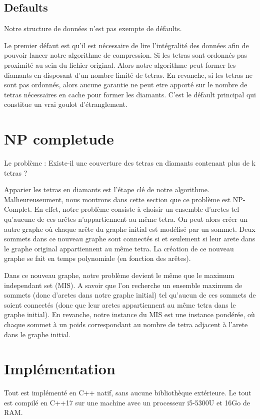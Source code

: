 \documentclass[a4paper,11pt,openany]{article}
\begin{document}
\subsection{Defaults}
Notre structure de données n'est pas exempte de défaults.

Le premier défaut est qu'il est nécessaire de lire l'intégralité des données afin de pouvoir lancer notre algorithme de compression. Si les tetras sont ordonnés pas proximité au sein du fichier original. Alors notre algorithme peut former les diamants en disposant d'un nombre limité de tetras. En revanche, si les tetras ne sont pas ordonnés, alors aucune garantie ne peut etre apporté sur le nombre de tetras nécessaires en cache pour former les diamants. 
C'est le défault principal qui constitue un vrai goulot d'étranglement.


\section{NP completude}

Le problème : Existe-il une couverture des tetras en diamants contenant plus de k tetras ?

Apparier les tetras en diamants est l'étape clé de notre algorithme. Malheureuseument, nous montrons dans cette section que ce problème est NP-Complet.
En effet, notre problème consiste à choisir un ensemble d'aretes tel qu'aucune de ces arêtes n'appartiennent au même tetra.
On peut alors créer un autre graphe où chaque arête du graphe initial est modélisé par un sommet. Deux sommets dans ce nouveau graphe sont connectés si et seulement si leur arete dans le graphe original appartiennent au même tetra.
La création de ce nouveau graphe se fait en temps polynomiale (en fonction des arêtes).

Dans ce nouveau graphe, notre problème devient le même que le maximum independant set (MIS). A savoir que l'on recherche un ensemble maximum de sommets (donc d'aretes dans notre graphe initial) tel qu'aucun de ces sommets de soient connectés (donc que leur aretes appartiennent au même tetra dans le graphe initial).
En revanche, notre instance du MIS est une instance pondérée, où chaque sommet à un poids correspondant au nombre de tetra adjacent à l'arete dans le graphe initial.



\section{Implémentation}
Tout est implémenté en C++ natif, sans aucune bibliothèque extérieure. Le tout est compilé en C++17 sur une machine avec un processeur i5-5300U et 16Go de RAM.
\end{document}
